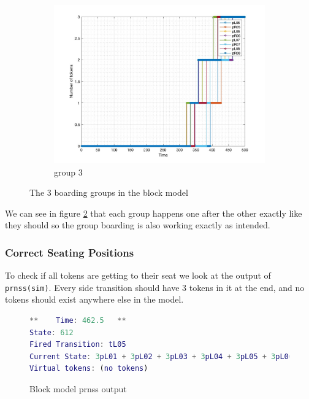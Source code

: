 \documentclass[english]{article}
\begin{document}
\begin{figure}[H]
\begin{subfigure}[b]{0.3\textwidth}
         \centering
         \includegraphics[width=\textwidth]{figures/group3.jpg}
         \caption{group 3}
         \label{fig:group3}
     \end{subfigure}
        \caption{The 3 boarding groups in the block model}
        \label{fig:groupboarding}
\end{figure}

We can see in figure \ref{fig:groupboarding} that each group happens one after the other exactly like they should so the group boarding is also working exactly as intended. 

\subsubsection{Correct Seating Positions}
To check if all tokens are getting to their seat we look at the output of \lstinline{prnss(sim)}. Every side transition should have 3 tokens in it at the end, and no tokens should exist anywhere else in the model. 

\begin{figure}[H]
    \centering
    \begin{lstlisting}[language=MATLAB]
**    Time: 462.5   **
State: 612
Fired Transition: tL05
Current State: 3pL01 + 3pL02 + 3pL03 + 3pL04 + 3pL05 + 3pL06 + 3pL07 + 3pL08 + 3pL09 + 3pL10 + 3pL11 + 3pL12 + 3pR01 + 3pR02 + 3pR03 + 3pR04 + 3pR05 + 3pR06 + 3pR07 + 3pR08 + 3pR09 + 3pR10 + 3pR11 + 3pR12   
Virtual tokens: (no tokens)
\end{lstlisting}
    \caption{Block model prnss output}
    \label{fig:blockprnss}
\end{figure}
\end{document}
